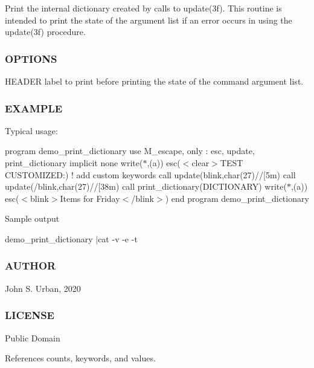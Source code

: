 Print the internal dictionary created by calls to update(3f). This routine is intended to print the state of the argument list if an error occurs in using the update(3f) procedure. \subsubsection*{O\+P\+T\+I\+O\+NS}

H\+E\+A\+D\+ER label to print before printing the state of the command argument list. \subsubsection*{E\+X\+A\+M\+P\+LE}

Typical usage\+:

program demo\+\_\+print\+\_\+dictionary use M\+\_\+escape, only \+: esc, update, print\+\_\+dictionary implicit none write($\ast$,\textquotesingle{}(a)\textquotesingle{}) esc(\textquotesingle{}$<$clear$>$T\+E\+ST C\+U\+S\+T\+O\+M\+I\+Z\+ED\+:\textquotesingle{}) ! add custom keywords call update(\textquotesingle{}blink\textquotesingle{},char(27)//\textquotesingle{}\mbox{[}5m\textquotesingle{}) call update(\textquotesingle{}/blink\textquotesingle{},char(27)//\textquotesingle{}\mbox{[}38m\textquotesingle{}) call print\+\_\+dictionary(\textquotesingle{}D\+I\+C\+T\+I\+O\+N\+A\+RY\textquotesingle{}) write($\ast$,\textquotesingle{}(a)\textquotesingle{}) esc(\textquotesingle{}$<$blink$>$Items for Friday$<$/blink$>$\textquotesingle{}) end program demo\+\_\+print\+\_\+dictionary

Sample output

demo\+\_\+print\+\_\+dictionary $\vert$cat -\/v -\/e -\/t

\subsubsection*{A\+U\+T\+H\+OR}

John S. Urban, 2020 \subsubsection*{L\+I\+C\+E\+N\+SE}

Public Domain 

References counts, keywords, and values.

\mbox{\label{namespacem__escape_af23bd97702864e0f32258e6ec0d51506}} 
